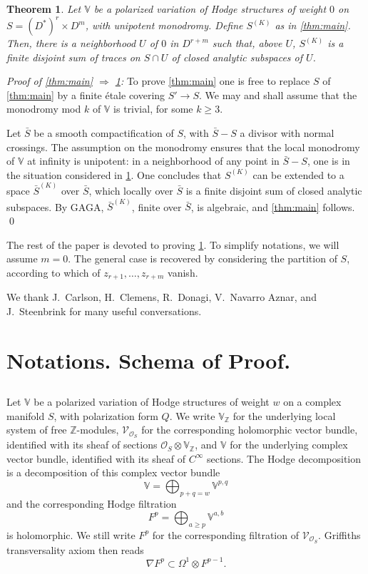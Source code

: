 \documentclass[11pt,a4paper]{article}
\theoremstyle{plain}
\newtheorem{theorem}{Theorem}[section]
\theoremstyle{definition}
\begin{document}
\begin{theorem}\label{thm:local}
Let $\mathbb{V}$ be a polarized variation of Hodge structures of weight $0$ on $S=(D^*)^r\times D^m$, with unipotent monodromy. Define $S^{(K)}$ as in \ref{thm:main}. Then, there is a neighborhood $U$ of $0$ in $D^{r+m}$ such that, above $U$, $S^{(K)}$ is a finite disjoint sum of traces on $S\cap U$ of closed analytic subspaces of $U$.
\end{theorem}

\noindent\textit{Proof of \ref{thm:main} $\Rightarrow$ \ref{thm:local}:} To prove \ref{thm:main} one is free to replace $S$ of \ref{thm:main} by a finite \'etale covering $S'\to S$. We may and shall assume that the monodromy mod $k$ of $\mathbb{V}$ is trivial, for some $k\geq 3$.

Let $\bar{S}$ be a smooth compactification of $S$, with $\bar{S}-S$ a divisor with normal crossings. The assumption on the monodromy ensures that the local monodromy of $\mathbb{V}$ at infinity is unipotent: in a neighborhood of any point in $\bar{S}-S$, one is in the situation considered in \ref{thm:local}. One concludes that $S^{(K)}$ can be extended to a space $\bar{S}^{(K)}$ over $\bar{S}$, which locally over $\bar{S}$ is a finite disjoint sum of closed analytic subspaces. By GAGA, $\bar{S}^{(K)}$, finite over $\bar{S}$, is algebraic, and \ref{thm:main} follows. \qed

The rest of the paper is devoted to proving \ref{thm:local}. To simplify notations, we will assume $m=0$. The general case is recovered by considering the partition of $S$, according to which of $z_{r+1},\dots,z_{r+m}$ vanish.

We thank J.~Carlson, H.~Clemens, R.~Donagi, V.~Navarro Aznar, and J.~Steenbrink for many useful conversations.


\section{Notations. Schema of Proof.}

\subsection{}
Let $\mathbb{V}$ be a polarized variation of Hodge structures of weight $w$ on a complex manifold $S$, with polarization form $Q$. We write $\mathbb{V}_{\mathbb{Z}}$ for the underlying local system of free $\mathbb{Z}$-modules, $\mathcal{V}_{\mathcal{O}_S}$ for the corresponding holomorphic vector bundle, identified with its sheaf of sections $\mathcal{O}_S\otimes\mathbb{V}_{\mathbb{Z}}$, and $\mathbb{V}$ for the underlying complex vector bundle, identified with its sheaf of $C^{\infty}$ sections. The Hodge decomposition is a decomposition of this complex vector bundle
\[
\mathbb{V}=\bigoplus_{p+q=w}\mathbb{V}^{p,q}
\]
and the corresponding Hodge filtration
\[
F^p=\bigoplus_{a\geq p}\mathbb{V}^{a,b}
\]
is holomorphic. We still write $F^p$ for the corresponding filtration of $\mathcal{V}_{\mathcal{O}_S}$. Griffiths transversality axiom then reads
\begin{equation}\label{eq:transversality}
\nabla F^p\subset \Omega^1\otimes F^{p-1}.
\end{equation}
\end{document}
